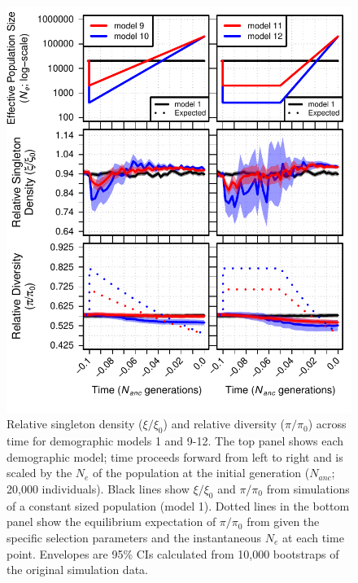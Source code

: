 \documentclass[9pt,twocolumn,twoside]{rilabRxiv}
\begin{document}
\begin{figure}[]
\includegraphics[width=0.5\linewidth]{figures/figsup912_newclean.pdf}
\caption{Relative singleton density ($\xi/\xi_0$) and relative diversity ($\pi/\pi_0$) across time for demographic models 1 and 9-12. The top panel shows each demographic model; time proceeds forward from left to right and is scaled by the $N_e$ of the population at the initial generation ($N_{anc}$; 20,000 individuals). Black lines show $\xi/\xi_0$ and $\pi/\pi_0$ from simulations of a constant sized population (model 1). Dotted lines in the bottom panel show the equilibrium expectation of $\pi/\pi_0$ from  \citet{nordborg1996effect} given the specific selection parameters and the instantaneous $N_e$ at each time point. Envelopes are 95\% CIs calculated from 10,000 bootstraps of the original simulation data.}
\label{fig:S912}
\end{figure}
\pagebreak
\end{document}
